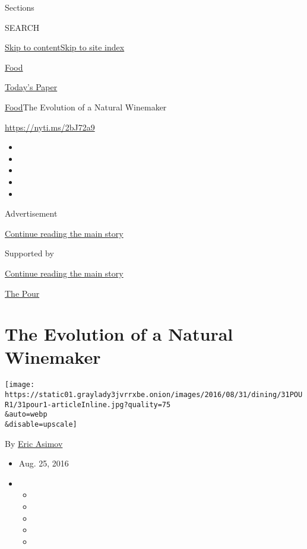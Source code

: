 Sections

SEARCH

\protect\hyperlink{site-content}{Skip to
content}\protect\hyperlink{site-index}{Skip to site index}

\href{https://www.nytimes3xbfgragh.onion/section/food}{Food}

\href{https://myaccount.nytimes3xbfgragh.onion/auth/login?response_type=cookie\&client_id=vi}{}

\href{https://www.nytimes3xbfgragh.onion/section/todayspaper}{Today's
Paper}

\href{/section/food}{Food}\textbar{}The Evolution of a Natural Winemaker

\url{https://nyti.ms/2bJ72a9}

\begin{itemize}
\item
\item
\item
\item
\item
\end{itemize}

Advertisement

\protect\hyperlink{after-top}{Continue reading the main story}

Supported by

\protect\hyperlink{after-sponsor}{Continue reading the main story}

\href{/column/the-pour}{The Pour}

\hypertarget{the-evolution-of-a-natural-winemaker}{%
\section{The Evolution of a Natural
Winemaker}\label{the-evolution-of-a-natural-winemaker}}

\texttt{[image: https://static01.graylady3jvrrxbe.onion/images/2016/08/31/dining/31POUR1/31pour1-articleInline.jpg?quality=75\\\&auto=webp\\\&disable=upscale]}

By \href{http://www.nytimes3xbfgragh.onion/by/eric-asimov}{Eric Asimov}

\begin{itemize}
\item
  Aug. 25, 2016
\item
  \begin{itemize}
  \item
  \item
  \item
  \item
  \item
  \end{itemize}
\end{itemize}

